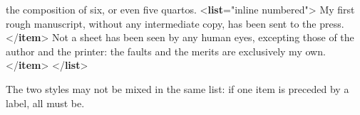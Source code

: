 \begin{shaded}
 the composition of six, or even five quartos.\mbox{}\newline 
{<\textbf{list}\hspace*{1em}{rend}="{inline numbered}">}\mbox{}\newline 
{}My first rough manuscript, without any\mbox{}\newline 
\hspace*{1em}\hspace*{1em} intermediate copy, has been sent to the press.{</\textbf{item}>}\mbox{}\newline 
{}Not a sheet has been seen by any human\mbox{}\newline 
\hspace*{1em}\hspace*{1em} eyes, excepting those of the author and the printer:\mbox{}\newline 
\hspace*{1em}\hspace*{1em} the faults and the merits are exclusively my own.{</\textbf{item}>}\mbox{}\newline 
{</\textbf{list}>}\end{shaded}\egroup\par \noindent  The two styles may not be mixed in the same list: if one item is preceded by a label, all must be.\par
